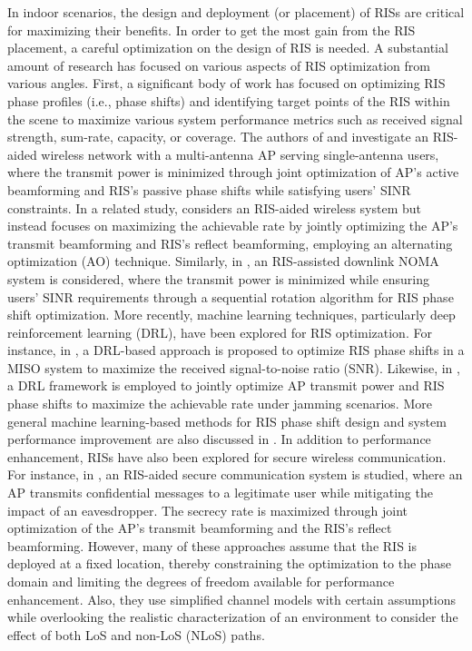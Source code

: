 \documentclass{IEEEoj}
\begin{document}
In indoor scenarios, the design and deployment (or placement) of RISs are critical for maximizing their benefits. In order to get the most gain from the RIS placement, a careful optimization on the design of RIS is needed. A substantial amount of research has focused on various aspects of RIS optimization from various angles. First, a significant body of work has focused on optimizing RIS phase profiles (i.e., phase shifts) and identifying target points of the RIS within the scene to maximize various system performance metrics such as received signal strength, sum-rate, capacity, or coverage. The authors of \cite{Wu2019} and \cite{Wu2019-2} investigate an RIS-aided wireless network with a multi-antenna AP serving single-antenna users, where the transmit power is minimized through joint optimization of AP's active beamforming and RIS's passive phase shifts while satisfying users' SINR constraints. In a related study, \cite{Abeywickrama2020} considers an RIS-aided wireless system but instead focuses on maximizing the achievable rate by jointly optimizing the AP’s transmit beamforming and RIS’s reflect beamforming, employing an alternating optimization (AO) technique. Similarly, in \cite{Wang2020}, an RIS-assisted downlink NOMA system is considered, where the transmit power is minimized while ensuring users' SINR requirements through a sequential rotation algorithm for RIS phase shift optimization. More recently, machine learning techniques, particularly deep reinforcement learning (DRL), have been explored for RIS optimization. For instance, in \cite{DRL1}, a DRL-based approach is proposed to optimize RIS phase shifts in a MISO system to maximize the received signal-to-noise ratio (SNR). Likewise, in \cite{DRL2}, a DRL framework is employed to jointly optimize AP transmit power and RIS phase shifts to maximize the achievable rate under jamming scenarios. More general machine learning-based methods for RIS phase shift design and system performance improvement are also discussed in \cite{DRL3}. In addition to performance enhancement, RISs have also been explored for secure wireless communication. For instance, in \cite{SecureRIS}, an RIS-aided secure communication system is studied, where an AP transmits confidential messages to a legitimate user while mitigating the impact of an eavesdropper. The secrecy rate is maximized through joint optimization of the AP’s transmit beamforming and the RIS’s reflect beamforming. However, many of these approaches assume that the RIS is deployed at a fixed location, thereby constraining the optimization to the phase domain and limiting the degrees of freedom available for performance enhancement. Also, they use simplified channel models with certain assumptions while overlooking the realistic characterization of an environment to consider the effect of both LoS and non-LoS (NLoS) paths.
\end{document}
